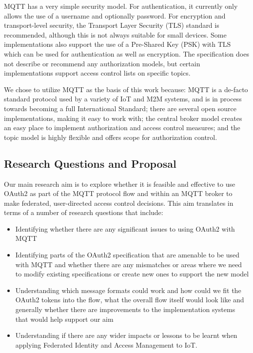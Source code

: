 \documentclass{IEEEtran}
\begin{document}
MQTT has a very simple security model. For authentication, it currently only allows the use of a username and optionally password.
For encryption and transport-level security, the Transport Layer Security (TLS) standard is recommended, 
although this is not always suitable for small devices. 
Some implementations also support the use of a Pre-Shared Key (PSK) with TLS which can be used for authentication as well as encryption.
The specification does not describe or recommend 
any authorization models, but certain implementations support access control lists on specific topics.

We chose to utilize MQTT as the basis of this 
work because: MQTT is a de-facto standard protocol used by a variety of IoT and M2M systems, and is in process towards becoming a full International Standard; there are several open source implementations, making it easy to work with; the central broker model creates an easy place to implement authorization and access control measures; and
the topic model is highly flexible and offers scope for authorization control.

\subsection{Research Questions and Proposal}
Our main research aim is to explore whether it is feasible and effective to use 
OAuth2 as part of the MQTT protocol flow and within an MQTT broker to make federated, user-directed access control 
decisions.  This aim translates in terms of a number of research questions that include:
\begin{itemize}
\item Identifying whether there are any significant issues to using OAuth2 with MQTT 
\item Identifying parts of the OAuth2 specification that are amenable to be used with MQTT and whether there are any mismatches or areas where we need to modify existing specifications or create new ones to support the new model
\item Understanding which message formats could work and how could we fit the OAuth2 tokens into the flow, what the overall flow itself would look like and generally whether there are improvements to the implementation systems that would help support our aim
\item Understanding if there are any wider impacts or lessons to be learnt when applying  Federated Identity and Access Management to IoT.
\end{itemize}
\end{document}
